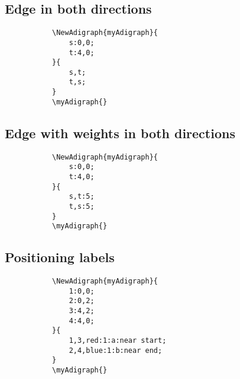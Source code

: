 \documentclass{report}
\begin{document}
\subsection{Edge in both directions}
\begin{figure}
	\begin{subfigure}{0.49\textwidth}
		\begin{verbatim}
\NewAdigraph{myAdigraph}{
 	s:0,0;
 	t:4,0;
}{
	s,t;
	t,s;
}
\myAdigraph{}
\end{verbatim}
	\end{subfigure}
	\begin{subfigure}{0.49\textwidth}
		\myAdigraph{}
	\end{subfigure}
\end{figure}

\subsection{Edge with weights in both directions}
\begin{figure}
	\begin{subfigure}{0.49\textwidth}
		\begin{verbatim}
\NewAdigraph{myAdigraph}{
 	s:0,0;
 	t:4,0;
}{
	s,t:5;
	t,s:5;
}
\myAdigraph{}
\end{verbatim}
	\end{subfigure}
	\begin{subfigure}{0.49\textwidth}
		\myAdigraph{}
	\end{subfigure}
\end{figure}

\subsection{Positioning labels}
\begin{figure}
	\begin{subfigure}{0.49\textwidth}
		\begin{verbatim}
\NewAdigraph{myAdigraph}{
	1:0,0;
	2:0,2;
	3:4,2;
	4:4,0;
}{
	1,3,red:1:a:near start;
	2,4,blue:1:b:near end;
}
\myAdigraph{}
\end{verbatim}
	\end{subfigure}
	\begin{subfigure}{0.49\textwidth}
		\myAdigraph{}
	\end{subfigure}
\end{figure}
\end{document}
